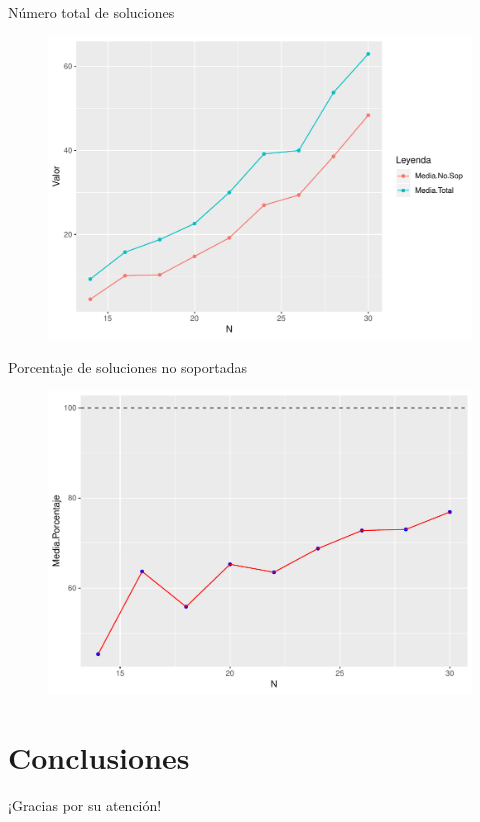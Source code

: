 \documentclass{beamer}
\begin{document}
\begin{frame}{Número total de soluciones}
\begin{figure}[h!]
\centering
\includegraphics[scale=0.47]{plot10}
\end{figure}
\end{frame}
\begin{frame}{Porcentaje de soluciones no soportadas}
\begin{figure}[h!]
\centering
\includegraphics[scale=0.47]{plot11}
\end{figure}
\end{frame}

\section{Conclusiones}
\begin{frame}
\begin{center}
\huge{¡Gracias por su atención!}
\end{center} 
\end{frame}
\end{document}

